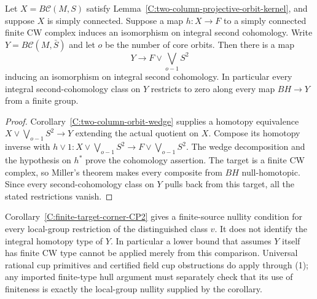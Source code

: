 \begin{lemma}
\label{C:finite-target-orbit-wedge}
Let $X=B\mathcal C(M,S)$ satisfy
Lemma~\ref{C:two-column-projective-orbit-kernel}, and suppose $X$
is simply connected. Suppose a map $h:X\to F$ to a simply
connected finite CW complex induces an isomorphism on integral
second cohomology. Write $Y=B\mathcal C(M,\bar S)$ and let $o$
be the number of core orbits. Then there is a map
\[
 Y\longrightarrow F\vee\bigvee_{o-1}S^2
\]
inducing an isomorphism on integral second cohomology.
In particular every integral second-cohomology class on $Y$
restricts to zero along every map $BH\to Y$ from a finite group.
\end{lemma}
\begin{proof}
Corollary~\ref{C:two-column-orbit-wedge} supplies a homotopy
equivalence $X\vee\bigvee_{o-1}S^2\to Y$ extending the actual
quotient on $X$. Compose its homotopy inverse with
$h\vee1:X\vee\bigvee_{o-1}S^2\to F\vee\bigvee_{o-1}S^2$.
The wedge decomposition and the hypothesis on $h^*$ prove the
cohomology assertion. The target is a finite CW complex, so
Miller's theorem makes every composite from $BH$ null-homotopic.
Since every second-cohomology class on $Y$ pulls back from this
target, all the stated restrictions vanish.
\end{proof}

\begin{remark}
\label{C:finite-target-corner-scope}
Corollary~\ref{C:finite-target-corner-CP2} gives a finite-source
nullity condition for
every local-group restriction of the distinguished class $v$.
It does not identify the integral homotopy type of $Y$.
In particular a lower bound that assumes $Y$ itself has finite
CW type cannot be applied merely from this comparison.
Universal rational cup primitives and certified field cup
obstructions do apply through (1); any imported finite-type hull
argument must separately check that its use of finiteness is
exactly the local-group nullity supplied by the corollary.
\end{remark}



